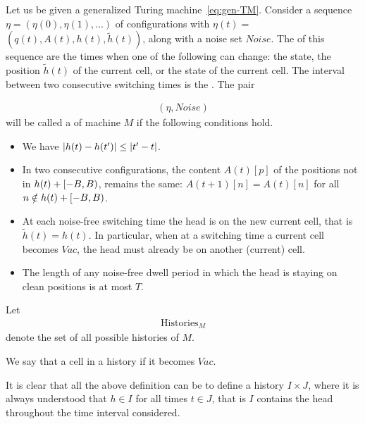 \documentclass[12pt]{memoir}
\renewcommand{\le}{\leq}
\def\B{B}
\newcommand{\Vacant}{\mathit{Vac}}
\newcommand{\h}{h}
\newcommand{\hc}{\tilde h}
\newcommand{\Noise}{\mathit{Noise}}
\newcommand{\Tu}{T}
\newcommand{\Histories}{\mathrm{Histories}}
\begin{document}
\begin{definition}[History]\label{def:history}
  \begin{sloppypar}
    Let us be given a generalized Turing machine~\eqref{eq:gen-TM}.
    Consider a sequence \( \eta = (\eta(0), \eta(1), \dots) \) of configurations with
    \( \eta(t) = \) \( (q(t), A(t), \h(t), \hc(t)) \), along with a noise set \( \Noise \).
    The  of this sequence 
are the times when one of the following can change:
the state, the position \( \hc(t) \) of the current cell, or the state of the current cell.
The interval between two consecutive switching times is the .
The pair
      \end{sloppypar}
    \begin{align*}
       (\eta,\Noise)
    \end{align*}
    will be called a  of machine \( M \) if the following conditions hold.
        \begin{itemize}
            \item We have \( \abs{\h(t) - \h(t')} \le \abs{t' - t} \).

            \item In two consecutive configurations, the content \( A(t)[p] \) of the positions not in
                  \( \h(t) + \lint{-\B}{\B} \), remains the same:
                  \( A(t+1)[n] = A(t)[n] \) for all \( n \notin \h(t) + \lint{-\B}{\B} \).

            \item At each noise-free switching time the head is on the new current cell, that is
\( \hc(t)=\h(t) \).
In particular, when at a switching time a current cell becomes
\( \Vacant \), the head must already be on another (current) cell.

            \item The length of any noise-free 
dwell period in which the head is staying on clean positions is at most \( \Tu \).

        \end{itemize}
    Let
        \begin{align*}
            \Histories_{M}
        \end{align*}
    denote the set of all possible histories of \( M \).

We say that a cell  in a history if it becomes \( \Vacant \).

It is clear that all the above definition can be  to define a history
 \( I\times J \), 
where it is always understood that \( \h\in I \) for all times \( t\in J \),
that is \( I \) contains the head throughout the time interval considered.

\end{definition}
\end{document}
